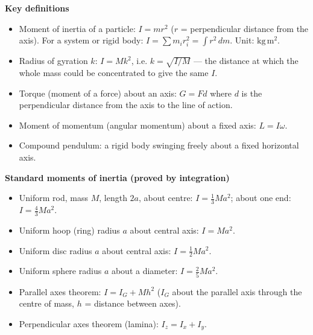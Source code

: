 \documentclass[11pt]{article}
\newcommand{\cle}[1]{{\popxbold\color{popdark}#1}}
\begin{document}
\begin{bilan}

\textbf{Key definitions}
\begin{itemize}
\item \cle{Moment of inertia} of a particle: $I=mr^{2}$ ($r$ = perpendicular distance from the axis). For a system or rigid body: $I=\sum m_i r_i^{2}=\int r^{2}\,dm$. Unit: $\mathrm{kg\,m^{2}}$.
\item \cle{Radius of gyration} $k$: $I=Mk^{2}$, i.e. $k=\sqrt{I/M}$ — the distance at which the whole mass could be concentrated to give the same $I$.
\item \cle{Torque} (moment of a force) about an axis: $G=Fd$ where $d$ is the perpendicular distance from the axis to the line of action.
\item \cle{Moment of momentum} (angular momentum) about a fixed axis: $L=I\omega$.
\item \cle{Compound pendulum}: a rigid body swinging freely about a fixed horizontal axis.
\end{itemize}

\textbf{Standard moments of inertia (proved by integration)}
\begin{itemize}
\item Uniform rod, mass $M$, length $2a$, about centre: $I=\tfrac13 Ma^{2}$; about one end: $I=\tfrac43 Ma^{2}$.
\item Uniform hoop (ring) radius $a$ about central axis: $I=Ma^{2}$.
\item Uniform disc radius $a$ about central axis: $I=\tfrac12 Ma^{2}$.
\item Uniform sphere radius $a$ about a diameter: $I=\tfrac25 Ma^{2}$.
\item \cle{Parallel axes theorem}: $I=I_G+Mh^{2}$ ($I_G$ about the parallel axis through the centre of mass, $h$ = distance between axes).
\item \cle{Perpendicular axes theorem} (lamina): $I_z=I_x+I_y$.
\end{itemize}


\end{bilan}
\end{document}
